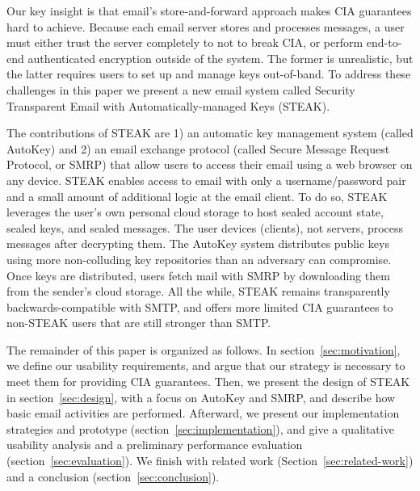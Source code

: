 Our key insight is that email's store-and-forward approach makes CIA 
guarantees hard to achieve. Because each email server stores and processes 
messages, a user must either trust the server completely to not to break 
CIA, or perform end-to-end authenticated encryption outside of the system. 
The former is unrealistic, but the latter requires users to set up and 
manage keys out-of-band. To address these challenges in this paper we 
present a new email system called Security Transparent Email with 
Automatically-managed Keys (STEAK). 

The contributions of STEAK are 1) an automatic key management system 
(called AutoKey) and 2) an email exchange protocol (called Secure Message 
Request Protocol, or SMRP) that allow users to access their email using a 
web browser on any device. STEAK enables access to email with only a 
username/password pair and a small amount of additional logic at the 
email client. To do so, STEAK leverages the user's own personal cloud 
storage to host sealed account state, sealed keys, and sealed messages. 
The user devices (clients), not servers, process messages after decrypting 
them.  The AutoKey system distributes public keys using more non-colluding 
key repositories than an adversary can compromise.  Once keys are distributed, users
fetch mail with SMRP by downloading them from the sender's cloud storage. All the while, 
STEAK remains transparently backwards-compatible with SMTP, and offers 
more limited CIA guarantees to non-STEAK users that are still stronger than SMTP.

The remainder of this paper is organized as follows.  In section~\ref{sec:motivation}, 
we define our usability requirements, and argue that our strategy is necessary 
to meet them for providing CIA guarantees. Then, we present the design of STEAK 
in section~\ref{sec:design}, with a focus on AutoKey and SMRP, and describe how basic 
email activities are performed.  Afterward, we present our 
implementation strategies and prototype (section~\ref{sec:implementation}), and give 
a qualitative usability 
analysis and a preliminary performance evaluation (section~\ref{sec:evaluation}).  
We finish with related work (Section~\ref{sec:related-work}) and a conclusion (section~\ref{sec:conclusion}).
